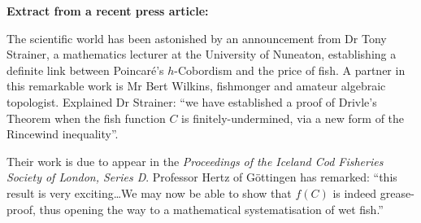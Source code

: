 \documentclass{article}
\begin{document}
\noindent \textbf{Extract from a recent press article:}

The scientific world has been astonished by an announcement from 
Dr Tony Strainer, a mathematics lecturer at the University of Nuneaton, establishing 
a definite link between Poincar\'e's $h$-Cobordism and the price of fish. A partner 
in this remarkable work is Mr Bert Wilkins, fishmonger and amateur
algebraic topologist. Explained Dr Strainer: ``we have
established a proof of Drivle's Theorem when the fish function $C$ 
is finitely-undermined, via a new form of the Rincewind inequality''. 

Their work is due to appear in the {\em Proceedings of the Iceland Cod Fisheries
Society of London, Series D}.
Professor Hertz of G\"ottingen has remarked: ``this result is
very exciting\dots We may now be able to show that $f(C)$ is indeed
grease-proof, thus opening the way to a mathematical systematisation
of wet fish.''
\end{document}
